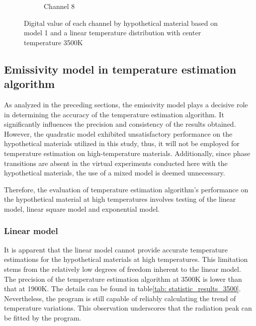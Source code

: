 \begin{figure}[htbp]
\begin{minipage}{0.87\textwidth}
\begin{subfigure}{0.23\textwidth}
            \caption{Channel 8}
        \end{subfigure}
    \end{minipage}
    \caption{Digital value of each channel by hypothetical material based on model 1
    and a linear temperature distribution with center temperature 3500K}
    \label{fig: channel_3500}
\end{figure}

\subsection{Emissivity model in temperature estimation algorithm}
As analyzed in the preceding sections, the emissivity model plays a decisive role in 
determining the accuracy of the temperature estimation algorithm. It significantly 
influences the precision and consistency of the results obtained. However, the quadratic 
model exhibited unsatisfactory performance on the hypothetical materials utilized in this study, 
thus, it will not be employed for temperature estimation on high-temperature materials. 
Additionally, since phase transitions are absent in the virtual experiments conducted here 
with the hypothetical materials, the use of a mixed model is deemed unnecessary.




Therefore, the evaluation of temperature estimation algorithm's performance 
on the hypothetical material at high temperatures involves testing of the linear model, 
linear square model and exponential model.


\subsubsection{Linear model}
It is apparent that the linear model cannot provide accurate temperature estimations 
for the hypothetical materials at high temperatures. This limitation stems from the 
relatively low degrees of freedom inherent to the linear model. The precision of the 
temperature estimation algorithm at 3500K is lower than that at 1900K. The details 
can be found in table\ref{tab: statistic_results_3500}.
Nevertheless, 
the program is still capable of reliably calculating the trend of temperature variations. 
This observation underscores that the radiation peak can be fitted by the 
program.


